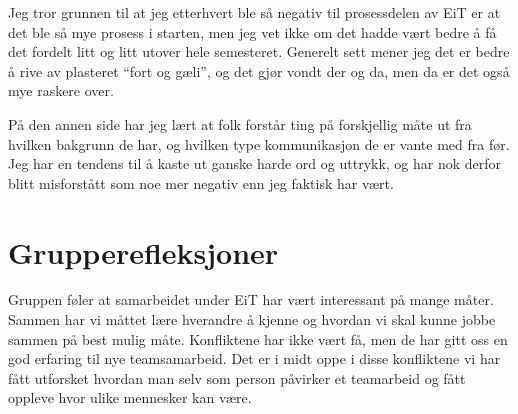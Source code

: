 Jeg tror grunnen til at jeg etterhvert ble så negativ til prosessdelen av EiT 
er at det ble så mye prosess i starten, men jeg vet ikke om det hadde vært bedre å få 
det fordelt litt og litt utover hele semesteret. Generelt sett mener jeg det er 
bedre å rive av plasteret ``fort og gæli'', og det gjør vondt der og da, men 
da er det også mye raskere over. 

På den annen side har jeg lært at folk forstår ting på forskjellig måte ut fra 
hvilken bakgrunn de har, og hvilken type kommunikasjon de er vante med fra før.
Jeg har en tendens til å kaste ut ganske harde ord og uttrykk, og har nok 
derfor blitt misforstått som noe mer negativ enn jeg faktisk har vært. 

\section{Grupperefleksjoner}

Gruppen føler at samarbeidet under EiT har vært interessant på mange måter. Sammen har vi måttet lære
hverandre å kjenne og hvordan vi skal kunne jobbe sammen på best mulig måte. Konfliktene har ikke vært få,
men de har gitt oss en god erfaring til nye teamsamarbeid. Det er i midt oppe i disse konfliktene vi har fått
utforsket hvordan man selv som person påvirker et teamarbeid og fått oppleve hvor ulike mennesker kan være. 

